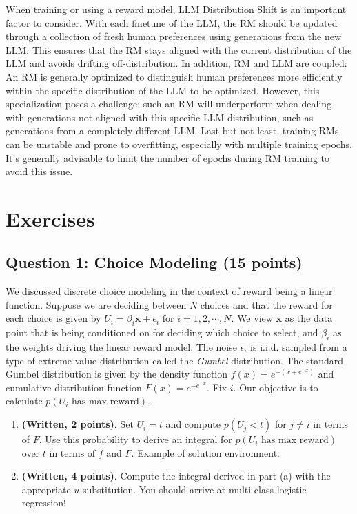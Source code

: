 \documentclass[
  letterpaper,
  numbers=noenddot,
  DIV=11]{scrreprt}
\theoremstyle{plain}
\theoremstyle{definition}
\theoremstyle{remark}
\begin{document}
When training or using a reward model, LLM Distribution Shift is an
important factor to consider. With each finetune of the LLM, the RM
should be updated through a collection of fresh human preferences using
generations from the new LLM. This ensures that the RM stays aligned
with the current distribution of the LLM and avoids drifting
off-distribution. In addition, RM and LLM are coupled: An RM is
generally optimized to distinguish human preferences more efficiently
within the specific distribution of the LLM to be optimized. However,
this specialization poses a challenge: such an RM will underperform when
dealing with generations not aligned with this specific LLM
distribution, such as generations from a completely different LLM. Last
but not least, training RMs can be unstable and prone to overfitting,
especially with multiple training epochs. It's generally advisable to
limit the number of epochs during RM training to avoid this issue.

\section{Exercises}\label{exercises}

\subsection*{Question 1: Choice Modeling (15
points)}\label{question-1-choice-modeling-15-points}

We discussed discrete choice modeling in the context of reward being a
linear function. Suppose we are deciding between \(N\) choices and that
the reward for each choice is given by
\(U_i=\beta_i\mathbf{x}+\epsilon_i\) for \(i=1, 2, \cdots, N\). We view
\(\mathbf{x}\) as the data point that is being conditioned on for
deciding which choice to select, and \(\beta_i\) as the weights driving
the linear reward model. The noise \(\epsilon_i\) is i.i.d. sampled from
a type of extreme value distribution called the \emph{Gumbel}
distribution. The standard Gumbel distribution is given by the density
function \(f(x)=e^{-(x+e^{-x})}\) and cumulative distribution function
\(F(x)=e^{-e^{-x}}.\) Fix \(i\). Our objective is to calculate
\(p(U_i\,\, \text{has max reward})\).

\begin{enumerate}
\def\labelenumi{(\alph{enumi})}
\item
  \textbf{(Written, 2 points)}. Set \(U_i=t\) and compute \(p(U_j<t)\)
  for \(j\neq i\) in terms of \(F\). Use this probability to derive an
  integral for \(p(U_i\,\,  \text{has max reward})\) over \(t\) in terms
  of \(f\) and \(F\). Example of solution environment.
\item
  \textbf{(Written, 4 points)}. Compute the integral derived in part (a)
  with the appropriate \(u\)-substitution. You should arrive at
  multi-class logistic regression!
\end{enumerate}
\end{document}
